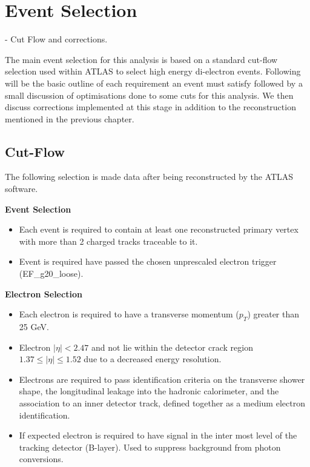 \chapter{Event Selection }
{\normalsize - Cut Flow and corrections.}

The main event selection for this analysis is based on a standard cut-flow selection used within ATLAS to select high energy di-electron events. Following will be the basic outline of each requirement an event must satisfy followed by a small discussion of optimisations done to some cuts for this analysis. We then discuss corrections implemented at this stage in addition to the reconstruction mentioned in the previous chapter.

\section{Cut-Flow}

The following selection is made data after being reconstructed by the ATLAS software.

{\bf Event Selection}
\begin{itemize}
\item Each event is required to contain at least one reconstructed primary vertex with more than 2 charged tracks traceable to it.
\item Event is required have passed the chosen unprescaled electron trigger (EF\_g20\_loose).
\end{itemize}


{\bf Electron Selection}
\begin{itemize}
\item Each electron is required to have a transverse momentum ($p_{T}$) greater than 25 GeV.
\item Electron $|\eta| < 2.47$ and not lie within the detector crack region $1.37 \leq |\eta| \leq 1.52$ due to a decreased energy resolution.
\item Electrons are required to pass identification criteria on the transverse shower shape, the longitudinal leakage into the hadronic calorimeter, and the association to an inner detector track, defined together as a medium electron identification.
\item If expected electron is required to have signal in the inter most level of the tracking detector (B-layer). Used to suppress background from photon conversions.
\end{itemize}


